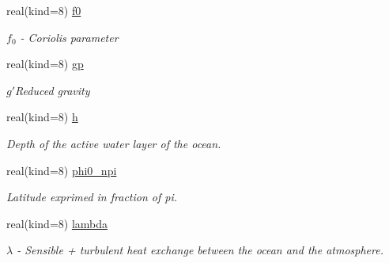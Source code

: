 \begin{DoxyCompactItemize}
real(kind=8) \hyperlink{structparams_1_1physicsconfiguration_a4963cc62487d1aca126ef12e4c890e73}{f0}
\begin{DoxyCompactList}\small\item\em $f_0$ -\/ Coriolis parameter \end{DoxyCompactList}\item 
\mbox{\label{structparams_1_1physicsconfiguration_ab65b9980a9b9b33ace337c35efcfedb8}} 
real(kind=8) \hyperlink{structparams_1_1physicsconfiguration_ab65b9980a9b9b33ace337c35efcfedb8}{gp}
\begin{DoxyCompactList}\small\item\em $g'$Reduced gravity \end{DoxyCompactList}\item 
\mbox{\label{structparams_1_1physicsconfiguration_a4d001a14087af4f6d1594704cd042c22}} 
real(kind=8) \hyperlink{structparams_1_1physicsconfiguration_a4d001a14087af4f6d1594704cd042c22}{h}
\begin{DoxyCompactList}\small\item\em Depth of the active water layer of the ocean. \end{DoxyCompactList}\item 
\mbox{\label{structparams_1_1physicsconfiguration_ad958e3395625b1202eee634355337750}} 
real(kind=8) \hyperlink{structparams_1_1physicsconfiguration_ad958e3395625b1202eee634355337750}{phi0\+\_\+npi}
\begin{DoxyCompactList}\small\item\em Latitude exprimed in fraction of pi. \end{DoxyCompactList}\item 
\mbox{\label{structparams_1_1physicsconfiguration_aeea146bfa6e50688b35d230e14fe0030}} 
real(kind=8) \hyperlink{structparams_1_1physicsconfiguration_aeea146bfa6e50688b35d230e14fe0030}{lambda}
\begin{DoxyCompactList}\small\item\em $\lambda$ -\/ Sensible + turbulent heat exchange between the ocean and the atmosphere. \end{DoxyCompactList}\item 
\mbox{\label{structparams_1_1physicsconfiguration_a24f09fe4d8acd7e961f3ce05245a8252}} 

\end{DoxyCompactItemize}
